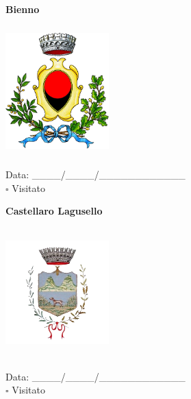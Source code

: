 \documentclass[a5paper,12pt]{article}
\begin{document}
\vspace{0.7cm}

\noindent
\begin{minipage}[t]{0.45\textwidth}
    \begin{center}
        \textbf{Bienno}
    \end{center}
    \vspace{-0.5cm} %
    \begin{center}
        \includegraphics[height= 5cm, width=4cm]{Lombardia/Stemma Bienno.png}
    \end{center}
    \vspace{-0.4cm} %
    \begin{flushleft}
        Data: \_\_\_\_/\_\_\_\_/\_\_\_\_\_\_\_\_\_\_\_\_ \\
        $\square$ Visitato
    \end{flushleft}
\end{minipage}
\hfill
\noindent
\begin{minipage}[t]{0.45\textwidth}
    \begin{center}
        \textbf{Castellaro Lagusello}
    \end{center}
    \vspace{-0.5cm} %
    \begin{center}
        \includegraphics[height= 5cm, width=4cm]{Lombardia/Stemma Castellaro Lagusello.png}
    \end{center}
    \vspace{-0.4cm} %
    \begin{flushleft}
        Data: \_\_\_\_/\_\_\_\_/\_\_\_\_\_\_\_\_\_\_\_\_ \\
        $\square$ Visitato
    \end{flushleft}
\end{minipage}
\end{document}
